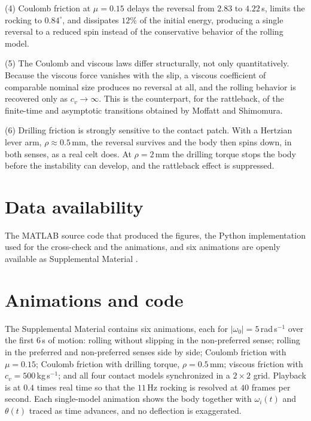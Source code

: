 \documentclass[aps,pre,twocolumn,superscriptaddress,amsmath,amssymb,floatfix,nofootinbib]{revtex4-2}
\begin{document}
(4) Coulomb friction at $\mu=0.15$ delays the reversal from $2.83$ to $4.22$\,s, limits
the rocking to $0.84^\circ$, and dissipates $12\%$ of the initial energy, producing a
single reversal to a reduced spin instead of the conservative behavior of the rolling
model.

(5) The Coulomb and viscous laws differ structurally, not only quantitatively. Because the
viscous force vanishes with the slip, a viscous coefficient of comparable nominal size
produces no reversal at all, and the rolling behavior is recovered only as
$c_v\to\infty$. This is the counterpart, for the rattleback, of the finite-time and
asymptotic transitions obtained by Moffatt and Shimomura.

(6) Drilling friction is strongly sensitive to the contact patch. With a Hertzian lever
arm, $\rho\approx0.5$\,mm, the reversal survives and the body then spins down, in both
senses, as a real celt does. At $\rho=2$\,mm the drilling torque stops the body before
the instability can develop, and the rattleback effect is suppressed.

\section*{Data availability}

The MATLAB source code that produced the figures, the Python implementation used for the
cross-check and the animations, and six animations are openly available as Supplemental
Material \cite{SM}.

\appendix

\section{Animations and code}\label{app:anim}

The Supplemental Material \cite{SM} contains six animations, each for
$|\omega_0|=5$\,rad\,s$^{-1}$ over the first $6$\,s of motion: rolling without slipping
in the non-preferred sense; rolling in the preferred and non-preferred senses side by
side; Coulomb friction with $\mu=0.15$; Coulomb friction with drilling torque,
$\rho=0.5$\,mm; viscous friction with $c_v=500$\,kg\,s$^{-1}$; and all four contact
models synchronized in a $2\times2$ grid. Playback is at $0.4$ times real time so that the
$11$\,Hz rocking is resolved at $40$ frames per second. Each single-model animation shows
the body together with $\omega_i(t)$ and $\theta(t)$ traced as time advances, and no
deflection is exaggerated.
\end{document}
